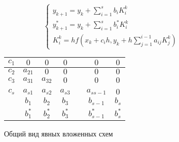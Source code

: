 \begin{figure}
    \begin{minipage}[t]{8.5cm}
        {\small
        \begin{equation*}
            \begin{cases}
                y_{k + 1} = y_k + \sum\limits_{i = 1}^sb_iK_i^k\\
                y_{k + 1}^* = y_k + \sum\limits_{i = 1}^sb_i^*K_i^k\\
                K_i^k = hf(x_k + c_ih, y_k + h\sum\limits_{j = 1}^{i - 1}a_{ij}K_j^k)
            \end{cases}
        \end{equation*}
        }
    \end{minipage}
    \begin{minipage}[t]{7.5cm}
        \begin{table}    
            \begin{tabular}{|c|c|c|c|c|c|c|}
            \hline
            $c_1$ & $0$ & $0$ & $0$ & & $0$ & $0$\\
            \hline
            $c_2$ & $a_{21}$ & $0$ & $0$ & & $0$ & $0$\\
            \hline
            $c_3$ & $a_{31}$ & $a_{32}$ & $0$ & & $0$ & $0$\\
            \hline
            & & & & & &\\
            \hline
            $c_s$ & $a_{s1}$ & $a_{s2}$ & $a_{s3}$ & & $a_{ss-1}$ & $0$\\
            \hline
            & \cellcolor{lightgray} $b_1$ & \cellcolor{lightgray} $b_2$ & \cellcolor{lightgray} $b_3$ & \cellcolor{lightgray} & \cellcolor{lightgray} $b_{s-1}$ &  \cellcolor{lightgray} $b_s$\\
            \hline
            & \cellcolor{lightgray} $b_1^*$ & \cellcolor{lightgray} $b_2^*$ & \cellcolor{lightgray} $b_3^*$ & \cellcolor{lightgray} & \cellcolor{lightgray} $b_{s-1}^*$ &  \cellcolor{lightgray} $b_s^*$\\
            \hline
            \end{tabular}
        \end{table}
    \end{minipage}
    \caption{Общий вид явных вложенных схем}
    \label{fig:Falberg}
\end{figure}

